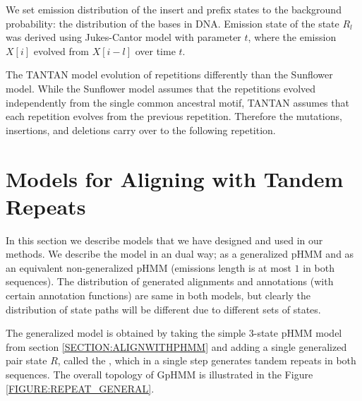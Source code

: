 We set emission distribution of the insert and prefix states to the background
probability: the distribution of the bases in DNA. Emission state of the state
$R_l$ was derived using Jukes-Cantor model with parameter $t$, where the
emission $X[i]$ evolved from $X[i-l]$ over time $t$.

The TANTAN model evolution of repetitions differently than the Sunflower model.
While the Sunflower model assumes that the repetitions evolved independently
from the single common ancestral motif,  TANTAN assumes that each repetition evolves
from the previous repetition. Therefore the mutations, insertions, and deletions
carry over to the following repetition.

\section{Models for Aligning with Tandem Repeats}\label{SECTION:REPMODELS}

In this section we describe models that we have designed and used in our
methods. We describe the model in an dual way; as a generalized pHMM and as an
equivalent non-generalized pHMM (emissions length is at most $1$ in both
sequences). The distribution of generated alignments and annotations (with
certain annotation functions) are same in both models, but clearly the
distribution of state paths will be different due to different sets of states.

The generalized model is obtained by taking the simple 3-state pHMM model from section
\ref{SECTION:ALIGNWITHPHMM} and adding a single generalized pair state $R$,
called the , which in a single step generates tandem
repeats in both sequences.  The
overall topology of GpHMM is illustrated in the Figure
\ref{FIGURE:REPEAT_GENERAL}.

